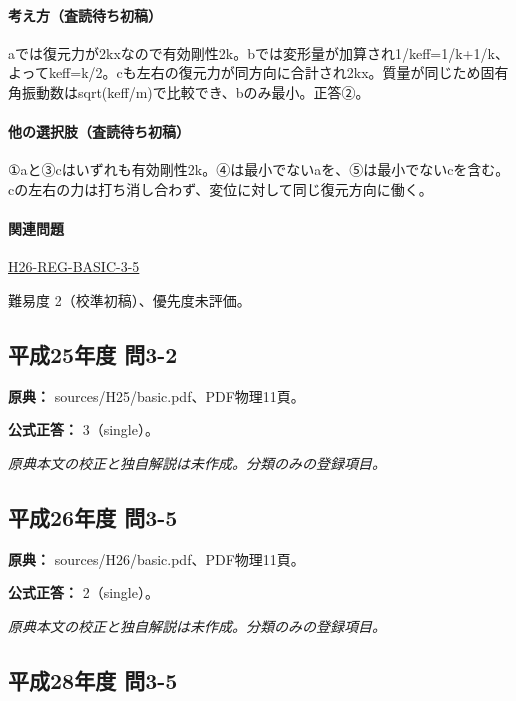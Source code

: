 \paragraph{考え方（査読待ち初稿）} aでは復元力が2kxなので有効剛性2k。bでは変形量が加算され1/keff=\allowbreak{}1/k+1/k、よってkeff=\allowbreak{}k/2。cも左右の復元力が同方向に合計され2kx。質量が同じため固有角振動数はsqrt(keff/m)で比較でき、bのみ最小。正答②。

\paragraph{他の選択肢（査読待ち初稿）} ①aと③cはいずれも有効剛性2k。④は最小でないaを、⑤は最小でないcを含む。cの左右の力は打ち消し合わず、変位に対して同じ復元方向に働く。

\paragraph{関連問題} \hyperref[q:h26-reg-basic-3-5]{H26-REG-BASIC-3-5}

\par 難易度 2（校準初稿）、優先度未評価。

\subsection{平成25年度 問3-2}
\label{q:h25-reg-basic-3-2}

\noindent\textbf{原典：} sources/H25/basic.pdf、PDF物理11頁。

\textbf{公式正答：} 3（single）。

\par\textit{原典本文の校正と独自解説は未作成。分類のみの登録項目。}

\subsection{平成26年度 問3-5}
\label{q:h26-reg-basic-3-5}

\noindent\textbf{原典：} sources/H26/basic.pdf、PDF物理11頁。

\textbf{公式正答：} 2（single）。

\par\textit{原典本文の校正と独自解説は未作成。分類のみの登録項目。}

\subsection{平成28年度 問3-5}
\label{q:h28-reg-basic-3-5}

